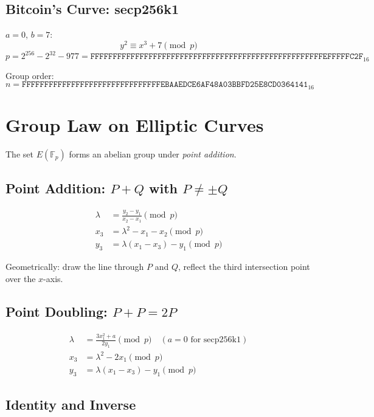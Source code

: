 \documentclass[12pt,a4paper,openany]{book}
\theoremstyle{definition}
\theoremstyle{plain}
\theoremstyle{remark}
\begin{document}
\subsection{Bitcoin's Curve: secp256k1}

$a=0$, $b=7$:
\begin{equation}
  \boxed{y^2 \equiv x^3+7 \pmod p}
\end{equation}
\[
  p = 2^{256}-2^{32}-977
  = \texttt{FFFFFFFFFFFFFFFFFFFFFFFFFFFFFFFFFFFFFFFFFFFFFFFFFFFFEFFFFFC2F}_{16}
\]

Group order:
\[
  n = \texttt{FFFFFFFFFFFFFFFFFFFFFFFFFFFFFFFEBAAEDCE6AF48A03BBFD25E8CD0364141}_{16}
\]

\section{Group Law on Elliptic Curves}

The set $E(\mathbb{F}_p)$ forms an abelian group under \emph{point addition}.

\subsection{Point Addition: $P+Q$ with $P\neq\pm Q$}

\begin{align}
  \lambda &= \frac{y_2-y_1}{x_2-x_1}\pmod p \\
  x_3 &= \lambda^2-x_1-x_2 \pmod p \\
  y_3 &= \lambda(x_1-x_3)-y_1 \pmod p
\end{align}

Geometrically: draw the line through $P$ and $Q$, reflect the third
intersection point over the $x$-axis.

\subsection{Point Doubling: $P+P=2P$}

\begin{align}
  \lambda &= \frac{3x_1^2+a}{2y_1}\pmod p \quad (a=0\text{ for secp256k1})\\
  x_3 &= \lambda^2-2x_1 \pmod p \\
  y_3 &= \lambda(x_1-x_3)-y_1 \pmod p
\end{align}

\subsection{Identity and Inverse}
\end{document}
